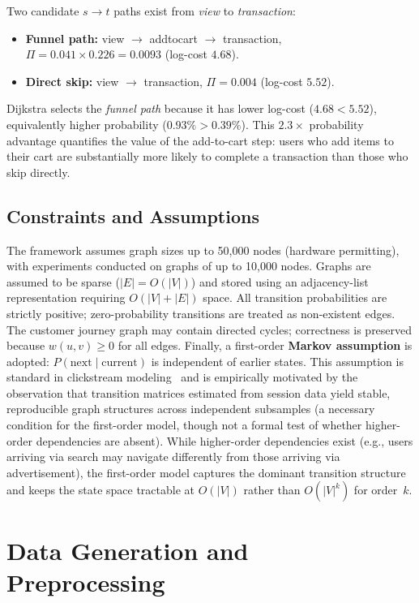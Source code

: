 \noindent Two candidate $s{\to}t$ paths exist from \emph{view} to \emph{transaction}:
\begin{itemize}[nosep]
  \item \textbf{Funnel path:} view $\to$ addtocart $\to$ transaction, $\Pi = 0.041 \times 0.226 = 0.0093$ (log-cost $4.68$).
  \item \textbf{Direct skip:} view $\to$ transaction, $\Pi = 0.004$ (log-cost $5.52$).
\end{itemize}
Dijkstra selects the \emph{funnel path} because it has lower log-cost ($4.68 < 5.52$), equivalently higher probability ($0.93\% > 0.39\%$). This $2.3\times$ probability advantage quantifies the value of the add-to-cart step: users who add items to their cart are substantially more likely to complete a transaction than those who skip directly.

\subsection{Constraints and Assumptions}

The framework assumes graph sizes up to 50,000 nodes (hardware permitting), with experiments conducted on graphs of up to 10,000 nodes. Graphs are assumed to be sparse ($|E| = O(|V|)$) and stored using an adjacency-list representation requiring $O(|V|+|E|)$ space. All transition probabilities are strictly positive; zero-probability transitions are treated as non-existent edges. The customer journey graph may contain directed cycles; correctness is preserved because $w(u,v) \geq 0$ for all edges. Finally, a first-order \textbf{Markov assumption} is adopted: $P(\text{next} \mid \text{current})$ is independent of earlier states. This assumption is standard in clickstream modeling~\citep{bucklin2003clickstream} and is empirically motivated by the observation that transition matrices estimated from session data yield stable, reproducible graph structures across independent subsamples (a necessary condition for the first-order model, though not a formal test of whether higher-order dependencies are absent). While higher-order dependencies exist (e.g., users arriving via search may navigate differently from those arriving via advertisement), the first-order model captures the dominant transition structure and keeps the state space tractable at $O(|V|)$ rather than $O(|V|^k)$ for order~$k$.

\section{Data Generation and Preprocessing}

